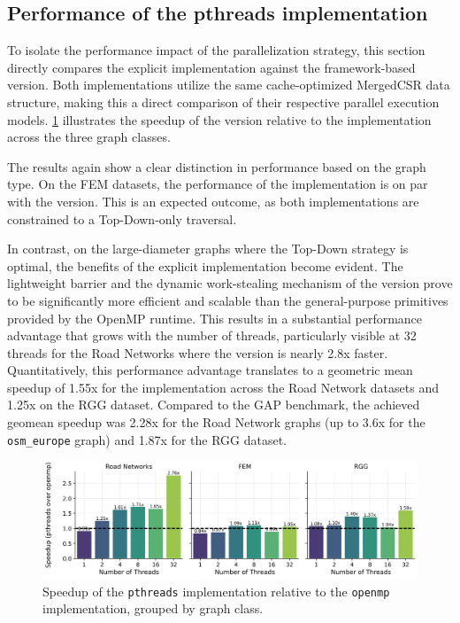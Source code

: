 \subsection{Performance of the pthreads implementation}
\label{sec:pthreadsperf}

To isolate the performance impact of the parallelization strategy, this section directly compares the explicit \pthreads{} implementation against the framework-based \openmp{} version. Both implementations utilize the same cache-optimized MergedCSR data structure, making this a direct comparison of their respective parallel execution models. \cref{fig:speedup_pthreads} illustrates the speedup of the \pthreads{} version relative to the \openmp{} implementation across the three graph classes.

The results again show a clear distinction in performance based on the graph type. On the FEM datasets, the performance of the \pthreads{} implementation is on par with the \openmp{} version. This is an expected outcome, as both implementations are constrained to a Top-Down-only traversal.

In contrast, on the large-diameter graphs where the Top-Down strategy is optimal, the benefits of the explicit \pthreads{} implementation become evident. The lightweight barrier and the dynamic work-stealing mechanism of the \pthreads{} version prove to be significantly more efficient and scalable than the general-purpose primitives provided by the OpenMP runtime. This results in a substantial performance advantage that grows with the number of threads, particularly visible at 32 threads for the Road Networks where the \pthreads{} version is nearly 2.8x faster. Quantitatively, this performance advantage translates to a geometric mean speedup of 1.55x for the \pthreads{} implementation across the Road Network datasets and 1.25x on the RGG dataset. Compared to the GAP benchmark, the achieved geomean speedup was 2.28x for the Road Network graphs (up to 3.6x for the \texttt{osm\_europe} graph) and 1.87x for the RGG dataset.

\begin{figure}[h!]
\centering
\includegraphics[width=0.95\linewidth]{images/speedup_pthreads.png}
\caption{Speedup of the \texttt{pthreads} implementation relative to the \texttt{openmp} implementation, grouped by graph class.}
\label{fig:speedup_pthreads}
\end{figure}

